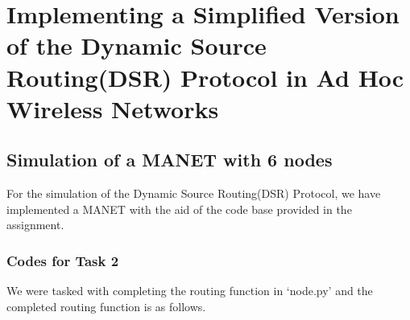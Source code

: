 \documentclass[a4paper,11pt]{article}%
\begin{document}
\pagebreak
\section{Implementing a Simplified Version of the Dynamic Source Routing(DSR) Protocol in Ad Hoc Wireless Networks}

\subsection{Simulation of a MANET with 6 nodes}
For the simulation of the Dynamic Source Routing(DSR) Protocol, we have implemented a MANET with the aid of the code base provided in the assignment.

\subsubsection{Codes for Task 2}

We were tasked with completing the routing function in ‘node.py’ and the completed routing function is as follows.\\
\end{document}
